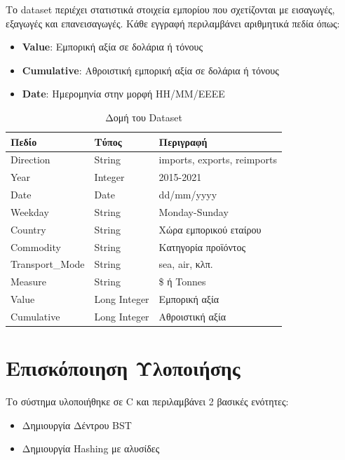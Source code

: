 \documentclass[a4paper,12pt]{article}
\begin{document}
Το dataset περιέχει στατιστικά στοιχεία εμπορίου που σχετίζονται με εισαγωγές, εξαγωγές και επανεισαγωγές. Κάθε εγγραφή περιλαμβάνει αριθμητικά πεδία όπως:

\begin{itemize}
	\item \textbf{Value}: Εμπορική αξία σε δολάρια ή τόνους
	\item \textbf{Cumulative}: Αθροιστική εμπορική αξία σε δολάρια ή τόνους
	\item \textbf{Date}: Ημερομηνία στην μορφή ΗΗ/ΜΜ/ΕΕΕΕ
\end{itemize}

\begin{table}[H]
	\centering
	\begin{tabular}{|l|l|l|}
		\hline
		\textbf{Πεδίο} & \textbf{Τύπος} & \textbf{Περιγραφή} \\
		\hline
		Direction & String & imports, exports, reimports \\
		Year & Integer & 2015-2021 \\
		Date & Date & dd/mm/yyyy \\
		Weekday & String & Monday-Sunday \\
		Country & String & Χώρα εμπορικού εταίρου \\
		Commodity & String & Κατηγορία προϊόντος \\
		Transport\_Mode & String & sea, air, κλπ. \\
		Measure & String & \$ ή Tonnes \\
		Value & Long Integer & Εμπορική αξία \\
		Cumulative & Long Integer & Αθροιστική αξία \\
		\hline
	\end{tabular}
	\caption{Δομή του Dataset}
\end{table}

\newpage

\section{Επισκόποιηση Υλοποιήσης}

Το σύστημα υλοποιήθηκε σε C και περιλαμβάνει 2 βασικές ενότητες:\\
\begin{itemize}
	\item Δημιουργία Δέντρου BST
	\item Δημιουργία Hashing με αλυσίδες
\end{itemize}
\end{document}
